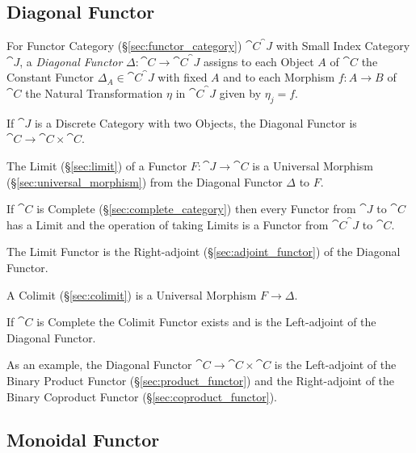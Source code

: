 \subsection{Diagonal Functor}\label{sec:diagonal_functor}

For Functor Category (\S\ref{sec:functor_category})
$\cat{C}^\cat{J}$ with Small Index Category $\cat{J}$, a
\emph{Diagonal Functor} $\Delta : \cat{C} \rightarrow
\cat{C}^\cat{J}$ assigns to each Object $A$ of $\cat{C}$ the
Constant Functor $\Delta_A \in \cat{C}^\cat{J}$ with fixed $A$
and to each Morphism $f : A \rightarrow B$ of $\cat{C}$ the Natural
Transformation $\eta$ in $\cat{C}^\cat{J}$ given by $\eta_j =
f$.

If $\cat{J}$ is a Discrete Category with two Objects, the Diagonal
Functor is $\cat{C} \rightarrow \cat{C} \times \cat{C}$.

The Limit (\S\ref{sec:limit}) of a Functor $F : \cat{J} \rightarrow
\cat{C}$ is a Universal Morphism (\S\ref{sec:universal_morphism})
from the Diagonal Functor $\Delta$ to $F$.

If $\cat{C}$ is Complete (\S\ref{sec:complete_category}) then every
Functor from $\cat{J}$ to $\cat{C}$ has a Limit and the
operation of taking Limits is a Functor from $\cat{C}^\cat{J}$
to $\cat{C}$.

The Limit Functor is the Right-adjoint (\S\ref{sec:adjoint_functor})
of the Diagonal Functor.

A Colimit (\S\ref{sec:colimit}) is a Universal Morphism $F \rightarrow
\Delta$.

If $\cat{C}$ is Complete the Colimit Functor exists and is the
Left-adjoint of the Diagonal Functor.

As an example, the Diagonal Functor $\cat{C} \rightarrow \cat{C}
\times \cat{C}$ is the Left-adjoint of the Binary Product Functor
(\S\ref{sec:product_functor}) and the Right-adjoint of the Binary
Coproduct Functor (\S\ref{sec:coproduct_functor}).



\subsection{Monoidal Functor}\label{sec:monoidal_functor}

